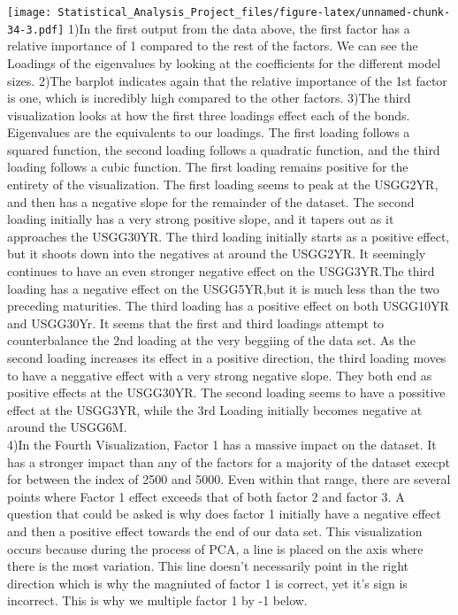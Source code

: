 \documentclass[]{article}
\begin{document}
\texttt{[image: Statistical\_Analysis\_Project\_files/figure-latex/unnamed-chunk-34-3.pdf]}
1)In the first output from the data above, the first factor has a
relative importance of 1 compared to the rest of the factors. We can see
the Loadings of the eigenvalues by looking at the coefficients for the
different model sizes. 2)The barplot indicates again that the relative
importance of the 1st factor is one, which is incredibly high compared
to the other factors. 3)The third visualization looks at how the first
three loadings effect each of the bonds. Eigenvalues are the equivalents
to our loadings. The first loading follows a squared function, the
second loading follows a quadratic function, and the third loading
follows a cubic function. The first loading remains positive for the
entirety of the visualization. The first loading seems to peak at the
USGG2YR, and then has a negative slope for the remainder of the dataset.
The second loading initially has a very strong positive slope, and it
tapers out as it approaches the USGG30YR. The third loading initially
starts as a positive effect, but it shoots down into the negatives at
around the USGG2YR. It seemingly continues to have an even stronger
negative effect on the USGG3YR.The third loading has a negative effect
on the USGG5YR,but it is much less than the two preceding maturities.
The third loading has a positive effect on both USGG10YR and USGG30Yr.
It seems that the first and third loadings attempt to counterbalance the
2nd loading at the very beggiing of the data set. As the second loading
increases its effect in a positive direction, the third loading moves to
have a neggative effect with a very strong negative slope. They both end
as positive effects at the USGG30YR. The second loading seems to have a
possitive effect at the USGG3YR, while the 3rd Loading initially becomes
negative at around the USGG6M.\\
4)In the Fourth Visualization, Factor 1 has a massive impact on the
dataset. It has a stronger impact than any of the factors for a majority
of the dataset execpt for between the index of 2500 and 5000. Even
within that range, there are several points where Factor 1 effect
exceeds that of both factor 2 and factor 3. A question that could be
asked is why does factor 1 initially have a negative effect and then a
positive effect towards the end of our data set. This visualization
occurs because during the process of PCA, a line is placed on the axis
where there is the most variation. This line doesn't necessarily point
in the right direction which is why the magniuted of factor 1 is
correct, yet it's sign is incorrect. This is why we multiple factor 1 by
-1 below.
\end{document}
